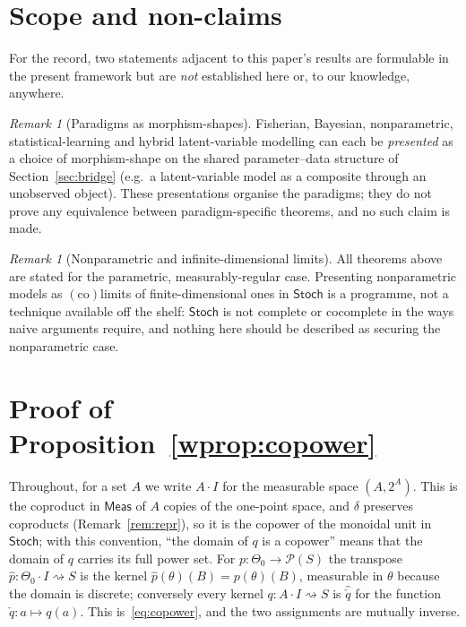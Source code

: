 \documentclass[11pt,a4paper]{article}
\theoremstyle{plain}
\theoremstyle{definition}
\theoremstyle{remark}
\newtheorem{caveat}[theorem]{Remark}
\newcommand{\cat}[1]{\mathsf{#1}}
\newcommand{\Meas}{\cat{Meas}}
\newcommand{\Stoch}{\cat{Stoch}}
\newcommand{\Prb}{\mathcal{P}}
\newcommand{\del}{\delta}
\begin{document}
\section{Scope and non-claims}\label{sec:nonclaims}

For the record, two statements adjacent to this paper's results are
formulable in the present framework but are \emph{not} established here or,
to our knowledge, anywhere.

\begin{caveat}[Paradigms as morphism-shapes]
Fisherian, Bayesian, nonparametric, statistical-learning and hybrid
latent-variable modelling can each be \emph{presented} as a choice of
morphism-shape on the shared parameter--data structure of
Section~\ref{sec:bridge} (e.g.\ a latent-variable model as a composite
through an unobserved object). These presentations organise the paradigms;
they do not prove any equivalence between paradigm-specific theorems, and no
such claim is made.
\end{caveat}


\begin{caveat}[Nonparametric and infinite-dimensional limits]
All theorems above are stated for the parametric, measurably-regular case.
Presenting nonparametric models as $(\text{co})$limits of finite-dimensional
ones in $\Stoch$ is a programme, not a technique available off the shelf:
$\Stoch$ is not complete or cocomplete in the ways naive arguments require,
and nothing here should be described as securing the nonparametric case.
\end{caveat}




\appendix
\section{Proof of Proposition~\ref{wprop:copower}}\label{app:copower}

Throughout, for a set $A$ we write $A \cdot I$ for the measurable space
$(A, 2^{A})$. This is the coproduct in $\Meas$ of $A$ copies of the one-point
space, and $\del$ preserves coproducts (Remark~\ref{rem:repr}), so it is the
copower of the monoidal unit in $\Stoch$; with this convention,
``the domain of $q$ is a copower'' means that the domain of $q$ carries its
full power set. For $p \colon \Theta_0 \to \Prb(S)$ the transpose
$\widehat{p} \colon \Theta_0 \cdot I \rightsquigarrow S$ is the kernel
$\widehat{p}(\theta)(B) = p(\theta)(B)$, measurable in $\theta$ because the
domain is discrete; conversely every kernel $q \colon A \cdot I
\rightsquigarrow S$ is $\widehat{\check q}$ for the function
$\check q \colon a \mapsto q(a)$. This is~\eqref{eq:copower}, and the two
assignments are mutually inverse.
\end{document}
